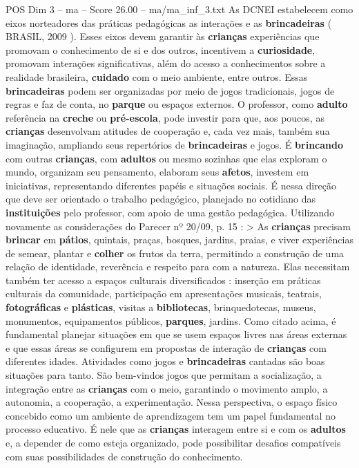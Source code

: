 \begin{textsample}{POS Dim 3 – ma – Score 26.00 – ma/ma\_inf\_3.txt}
As DCNEI estabelecem como eixos norteadores das práticas pedagógicas as interações e as \textbf{brincadeiras} ( BRASIL, 2009 ).
Esses eixos devem garantir às \textbf{crianças} experiências que promovam o conhecimento de si e dos outros, incentivem a \textbf{curiosidade}, promovam interações significativas, além do acesso a conhecimentos sobre a realidade brasileira, \textbf{cuidado} com o meio ambiente, entre outros.
Essas \textbf{brincadeiras} podem ser organizadas por meio de jogos tradicionais, jogos de regras e faz de conta, no \textbf{parque} ou espaços externos.
O professor, como \textbf{adulto} referência na \textbf{creche} ou \textbf{pré-escola}, pode investir para que, aos poucos, as \textbf{crianças} desenvolvam atitudes de cooperação e, cada vez mais, também sua imaginação, ampliando seus repertórios de \textbf{brincadeiras} e jogos.
É \textbf{brincando} com outras \textbf{crianças}, com \textbf{adultos} ou mesmo sozinhas que elas exploram o mundo, organizam seu pensamento, elaboram seus \textbf{afetos}, investem em iniciativas, representando diferentes papéis e situações sociais.
É nessa direção que deve ser orientado o trabalho pedagógico, planejado no cotidiano das \textbf{instituições} pelo professor, com apoio de uma gestão pedagógica.
Utilizando novamente as considerações do Parecer nº 20/09, p. 15 : > As \textbf{crianças} precisam \textbf{brincar} em \textbf{pátios}, quintais, praças, bosques, jardins, praias, e viver experiências de semear, plantar e \textbf{colher} os frutos da terra, permitindo a construção de uma relação de identidade, reverência e respeito para com a natureza.
Elas necessitam também ter acesso a espaços culturais diversificados : inserção em práticas culturais da comunidade, participação em apresentações musicais, teatrais, \textbf{fotográficas} e \textbf{plásticas}, visitas a \textbf{bibliotecas}, brinquedotecas, museus, monumentos, equipamentos públicos, \textbf{parques}, jardins.
Como citado acima, é fundamental planejar situações em que se usem espaços livres nas áreas externas e que essas áreas se configurem em propostas de interação de \textbf{crianças} com diferentes idades.
Atividades como jogos e \textbf{brincadeiras} cantadas são boas situações para tanto.
São bem-vindos jogos que permitam a socialização, a integração entre as \textbf{crianças} com o meio, garantindo o movimento amplo, a autonomia, a cooperação, a experimentação.
Nessa perspectiva, o espaço físico concebido como um ambiente de aprendizagem tem um papel fundamental no processo educativo.
É nele que as \textbf{crianças} interagem entre si e com os \textbf{adultos} e, a depender de como esteja organizado, pode possibilitar desafios compatíveis com suas possibilidades de construção do conhecimento.

\end{textsample}
